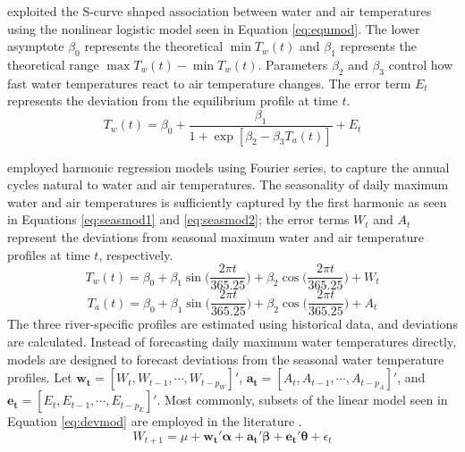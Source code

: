 \cite{Mohseni1998} exploited the S-curve shaped association between water and air temperatures using the nonlinear logistic model seen in Equation \ref{eq:equmod}. The lower asymptote $\beta_0$ represents the theoretical $\min T_w(t)$ and $\beta_1$ represents the theoretical range $\max T_w(t)- \min T_w(t)$. Parameters $\beta_2$ and $\beta_3$ control how fast water temperatures react to air temperature changes. The error term $E_t$ represents the deviation from the equilibrium profile at time $t$. 
\begin{equation}
	\label{eq:equmod}
	T_w(t)=\beta_0+\frac{\beta_1}{1+\exp[{\beta_2-\beta_3T_a(t)}]}+E_t
 \end{equation}
 
\cite{Caissie1998} employed harmonic regression models using Fourier series, to capture the annual cycles natural to water and air temperatures. The seasonality of daily maximum water and air temperatures is sufficiently captured by the first harmonic as seen in Equations \ref{eq:seasmod1} and \ref{eq:seasmod2}; the error terms $W_t$ and $A_t$ represent the deviations from seasonal maximum water and air temperature profiles at time $t$, respectively.
\begin{equation}
	\label{eq:seasmod1}
	T_w(t)=\beta_{0}+\beta_1\sin\bigg(\frac{2\pi t}{365.25}\bigg)+\beta_2\cos\bigg(\frac{2\pi t}{365.25}\bigg) + W_t
 \end{equation} 
 \begin{equation}
	\label{eq:seasmod2}
	T_a(t)=\beta_0+\beta_1\sin\bigg(\frac{2\pi t}{365.25}\bigg)+\beta_2\cos\bigg(\frac{2\pi t}{365.25}\bigg) + A_t
 \end{equation} 
The three river-specific profiles are estimated using historical data, and deviations are calculated. Instead of forecasting daily maximum water temperatures directly, models are designed to forecast deviations from the seasonal water temperature profiles. Let $\bm{w_t}=[W_{t},W_{t-1}, \cdots, W_{t-p_W}]'$, $\bm{a_t}=[A_t, A_{t-1}, \cdots, A_{t-p_A}]'$, and $\bm{e_t}=[E_t, E_{t-1}, \cdots, E_{t-p_E}]'$. Most commonly, subsets of the linear model seen in Equation \ref{eq:devmod} are employed in the literature \citep{Benyahya2007, Caissie2001}.
  \begin{equation}
	\label{eq:devmod}
	W_{t+1}=\mu+\bm{w_t}'\bm{\alpha} + \bm{a_t}'\bm{\beta} +  \bm{e_t}'\bm{\theta}+\epsilon_t
 \end{equation}
 
